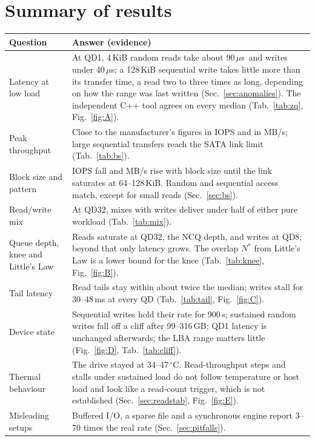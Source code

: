 \documentclass{article}
\newcommand{\us}{\,$\mu$s}
\begin{document}
\appendix
\section{Summary of results}\label{sec:summary}
{\small
\begin{tabular}{p{3.3cm}p{12.7cm}}
\toprule
\textbf{Question} & \textbf{Answer (evidence)} \\
\midrule
Latency at low load & At QD1, 4\,KiB random reads take about 90\us\ and writes under 40\us; a 128\,KiB sequential write takes little more than its transfer time, a read two to three times as long, depending on how the range was last written (Sec.~\ref{sec:anomalies}). The independent C++ tool agrees on every median (Tab.~\ref{tab:zq}, Fig.~\ref{fig:A}). \\
Peak throughput & Close to the manufacturer's figures in IOPS and in MB/s; large sequential transfers reach the SATA link limit (Tab.~\ref{tab:bs}). \\
Block size and pattern & IOPS fall and MB/s rise with block size until the link saturates at 64--128\,KiB. Random and sequential access match, except for small reads (Sec.~\ref{sec:bs}). \\
Read/write mix & At QD32, mixes with writes deliver under half of either pure workload (Tab.~\ref{tab:mix}). \\
Queue depth, knee and Little's Law & Reads saturate at QD32, the NCQ depth, and writes at QD8; beyond that only latency grows. The overlap $N^{*}$ from Little's Law is a lower bound for the knee (Tab.~\ref{tab:knee}, Fig.~\ref{fig:B}). \\
Tail latency & Read tails stay within about twice the median; writes stall for 30--48\,ms at every QD (Tab.~\ref{tab:tail}, Fig.~\ref{fig:C}). \\
Device state & Sequential writes hold their rate for 900\,s; sustained random writes fall off a cliff after 99--316\,GB; QD1 latency is unchanged afterwards; the LBA range matters little (Fig.~\ref{fig:D}, Tab.~\ref{tab:cliff}). \\
Thermal behaviour & The drive stayed at 34--47\,$^{\circ}$C. Read-throughput steps and stalls under sustained load do not follow temperature or host load and look like a read-count trigger, which is not established (Sec.~\ref{sec:readstab}, Fig.~\ref{fig:E}). \\
Misleading setups & Buffered I/O, a sparse file and a synchronous engine report 3--70 times the real rate (Sec.~\ref{sec:pitfalls}). \\
\bottomrule
\end{tabular}
}
\end{document}
